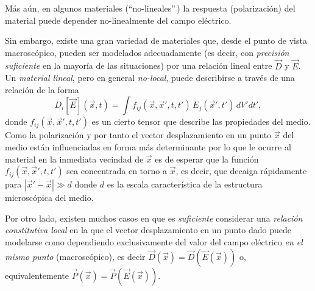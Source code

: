 Más aún, en algunos materiales (``no-lineales''\,) la respuesta
(polarización) del material puede depender no-linealmente del campo eléctrico.

Sin embargo, existe una gran variedad de materiales que, desde el punto de
vista macroscópico, pueden ser modelados adecuadamente (es decir, con \textit{precisión suficiente} en la mayoría de las situaciones) por una relación lineal entre $\vec{D}$ y $\vec{E}$. Un \textit{material lineal}, pero en general \textit{no-local}, puede describirse a
través de una relación de la forma
\begin{equation}
D_i[\vec{E}](\vec{x},t)=\int
f_{ij}(\vec{x},\vec{x}',t,t')\,{E}_j(\vec{x}',t')\,dV' dt',
\end{equation}
donde $f_{ij}(\vec{x},\vec{x}',t,t')$ es un cierto tensor que describe las
propiedades del medio. Como la polarización y por tanto el vector
desplazamiento en un punto $\vec{x}$ del medio están influenciadas en forma
más determinante por lo que le ocurre al material en la inmediata vecindad de
$\vec{x}$ es de esperar que la función $f_{ij}(\vec{x},\vec{x}',t,t')$ sea
concentrada en torno a $\vec{x}$, es decir, que decaiga rápidamente para
$|\vec{x}'-\vec{x}|\gg d$ donde $d$ es la escala característica de la
estructura microscópica del medio.

Por otro lado, existen muchos casos en que es \textit{suficiente} considerar una
\textit{relación constitutiva local} en la que el vector desplazamiento en un
punto dado puede modelarse como dependiendo exclusivamente del valor del campo
eléctrico \textit{en el mismo punto} (macroscópico), es decir
$\vec{D}(\vec{x})=\vec{D}(\vec{E}(\vec{x}))$ o, equivalentemente
$\vec{P}(\vec{x})=\vec{P}(\vec{E}(\vec{x}))$.

